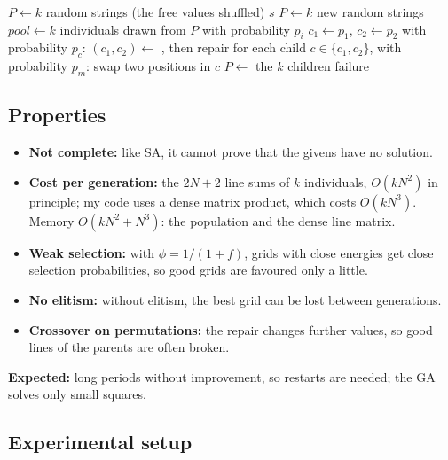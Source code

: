 \documentclass[11pt,a4paper]{article}
\begin{document}
\begin{algorithm}[H]
\small
\caption{Genetic algorithm}
\label{alg:ga}
\begin{algorithmic}[1]
  \State $P\gets k$ random strings (the free values shuffled)
  \Repeat
     \State \Return $s$ \EndIf
     \State $P\gets k$ new random strings \EndIf
    \State $pool\gets k$ individuals drawn from $P$ with probability $p_i$
      \State $c_1\gets p_1$, $c_2\gets p_2$
      \State with probability $p_c$: $(c_1,c_2)\gets$ , then repair
      \State for each child $c\in\{c_1,c_2\}$, with probability $p_m$: swap two positions in $c$
    \EndFor
    \State $P\gets$ the $k$ children
  \State \Return failure
\EndFunction
\end{algorithmic}
\end{algorithm}

\subsection{Properties}
\label{sec:gaprops}

\begin{itemize}[nosep]
  \item \textbf{Not complete:} like SA, it cannot prove that the givens
        have no solution.
  \item \textbf{Cost per generation:} the $2N+2$ line sums of $k$
        individuals, $O(kN^2)$ in principle; my code uses a dense matrix
        product, which costs $O(kN^3)$. Memory $O(kN^2+N^3)$: the population
        and the dense line matrix.
  \item \textbf{Weak selection:} with $\phi=1/(1+f)$, grids with close
        energies get close selection probabilities, so good grids are
        favoured only a little.
  \item \textbf{No elitism:} without elitism, the best grid can be lost
        between generations.
  \item \textbf{Crossover on permutations:} the repair changes further
        values, so good lines of the parents are often broken.
\end{itemize}
\noindent\textbf{Expected:} long periods without improvement, so restarts
are needed; the GA solves only small squares.

\subsection{Experimental setup}
\end{document}
